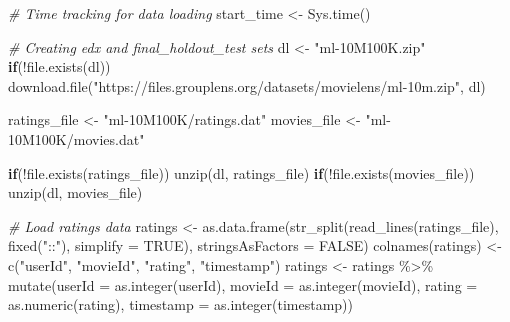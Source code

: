 \documentclass[
]{article}
\newenvironment{Shaded}{}{}
\newcommand{\AttributeTok}[1]{\textcolor[rgb]{0.49,0.56,0.16}{#1}}
\newcommand{\CommentTok}[1]{\textcolor[rgb]{0.38,0.63,0.69}{\textit{#1}}}
\newcommand{\ConstantTok}[1]{\textcolor[rgb]{0.53,0.00,0.00}{#1}}
\newcommand{\ControlFlowTok}[1]{\textcolor[rgb]{0.00,0.44,0.13}{\textbf{#1}}}
\newcommand{\FunctionTok}[1]{\textcolor[rgb]{0.02,0.16,0.49}{#1}}
\newcommand{\NormalTok}[1]{#1}
\newcommand{\OtherTok}[1]{\textcolor[rgb]{0.00,0.44,0.13}{#1}}
\newcommand{\SpecialCharTok}[1]{\textcolor[rgb]{0.25,0.44,0.63}{#1}}
\newcommand{\StringTok}[1]{\textcolor[rgb]{0.25,0.44,0.63}{#1}}
\begin{document}
\begin{Shaded}
\begin{Highlighting}[]
\CommentTok{\# Time tracking for data loading}
\NormalTok{start\_time }\OtherTok{\textless{}{-}} \FunctionTok{Sys.time}\NormalTok{()}

\CommentTok{\# Creating edx and final\_holdout\_test sets}
\NormalTok{dl }\OtherTok{\textless{}{-}} \StringTok{"ml{-}10M100K.zip"}
\ControlFlowTok{if}\NormalTok{(}\SpecialCharTok{!}\FunctionTok{file.exists}\NormalTok{(dl))}
  \FunctionTok{download.file}\NormalTok{(}\StringTok{"https://files.grouplens.org/datasets/movielens/ml{-}10m.zip"}\NormalTok{, dl)}

\NormalTok{ratings\_file }\OtherTok{\textless{}{-}} \StringTok{"ml{-}10M100K/ratings.dat"}
\NormalTok{movies\_file }\OtherTok{\textless{}{-}} \StringTok{"ml{-}10M100K/movies.dat"}

\ControlFlowTok{if}\NormalTok{(}\SpecialCharTok{!}\FunctionTok{file.exists}\NormalTok{(ratings\_file))}
  \FunctionTok{unzip}\NormalTok{(dl, ratings\_file)}
\ControlFlowTok{if}\NormalTok{(}\SpecialCharTok{!}\FunctionTok{file.exists}\NormalTok{(movies\_file))}
  \FunctionTok{unzip}\NormalTok{(dl, movies\_file)}

\CommentTok{\# Load ratings data}
\NormalTok{ratings }\OtherTok{\textless{}{-}} \FunctionTok{as.data.frame}\NormalTok{(}\FunctionTok{str\_split}\NormalTok{(}\FunctionTok{read\_lines}\NormalTok{(ratings\_file), }
                                   \FunctionTok{fixed}\NormalTok{(}\StringTok{"::"}\NormalTok{), }
                                   \AttributeTok{simplify =} \ConstantTok{TRUE}\NormalTok{), }
                         \AttributeTok{stringsAsFactors =} \ConstantTok{FALSE}\NormalTok{)}
\FunctionTok{colnames}\NormalTok{(ratings) }\OtherTok{\textless{}{-}} \FunctionTok{c}\NormalTok{(}\StringTok{"userId"}\NormalTok{, }\StringTok{"movieId"}\NormalTok{, }\StringTok{"rating"}\NormalTok{, }\StringTok{"timestamp"}\NormalTok{)}
\NormalTok{ratings }\OtherTok{\textless{}{-}}\NormalTok{ ratings }\SpecialCharTok{\%\textgreater{}\%} 
  \FunctionTok{mutate}\NormalTok{(}\AttributeTok{userId =} \FunctionTok{as.integer}\NormalTok{(userId),}
         \AttributeTok{movieId =} \FunctionTok{as.integer}\NormalTok{(movieId),}
         \AttributeTok{rating =} \FunctionTok{as.numeric}\NormalTok{(rating),}
         \AttributeTok{timestamp =} \FunctionTok{as.integer}\NormalTok{(timestamp))}


\end{Highlighting}
\end{Shaded}
\end{document}
